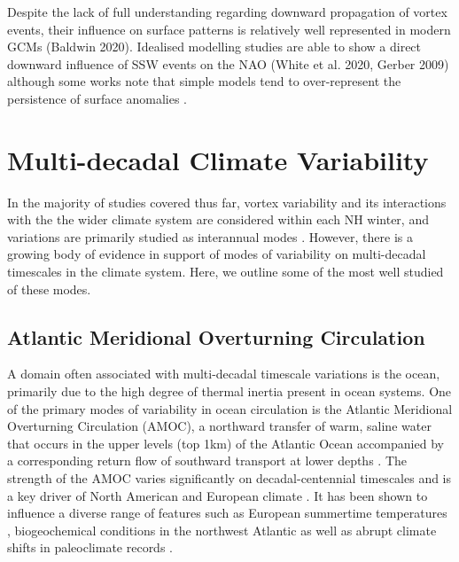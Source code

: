 Despite the lack of full understanding regarding downward propagation of vortex events, their influence on surface patterns is relatively well represented in modern GCMs (Baldwin 2020). Idealised modelling studies are able to show a direct downward influence of SSW events on the NAO (White et al. 2020, Gerber 2009) although some works note that simple models tend to over-represent the persistence of surface anomalies \citep{gerberAnnular2008, gerberTesting2008}. 

\section{Multi-decadal Climate Variability}
\label{sec:multi-decadal_background}
In the majority of studies covered thus far, vortex variability and its interactions with the the wider climate system are considered within each NH winter, and variations are primarily studied as interannual modes . However, there is a growing body of evidence in support of modes of variability on multi-decadal timescales in the climate system. Here, we outline some of the most well studied of these modes. 

\subsection{Atlantic Meridional Overturning Circulation}
A domain often associated with multi-decadal timescale variations is the ocean, primarily due to the high degree of thermal inertia present in ocean systems. One of the primary modes of variability in ocean circulation is the Atlantic Meridional Overturning Circulation (AMOC), a northward transfer of warm, saline water that occurs in the upper levels (top 1km) of the Atlantic Ocean accompanied by a corresponding return flow of southward transport at lower depths \citep{kuhlbrodtDriving2007, xuIntraseasonal2014}. The strength of the AMOC varies significantly on decadal-centennial timescales \citep{delworthInterdecadal1993, biastochCauses2008a, tullochExploring2012, menaryMultimodel2012} and is a key driver of North American and European climate \citep{knightSignature2005, delworthObserved2000, friersonContribution2013, frankignoulInfluence2013}. It has been shown to influence a diverse range of features such as European summertime temperatures \citep{suttonAtlantic2005}, biogeochemical conditions in the northwest Atlantic \citep{lavoieProjections2019} as well as abrupt climate shifts in paleoclimate records \citep{alleyWally2007a, chengIce2009a}.

